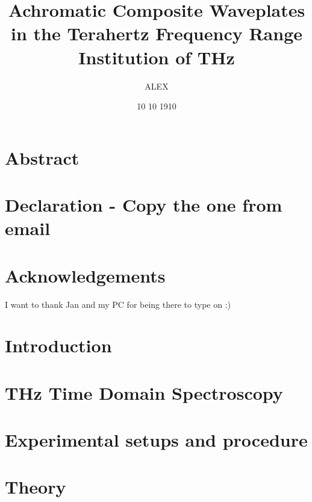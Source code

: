 \documentclass[12pt, a4paper]{report}
\title{
{Achromatic Composite Waveplates in the Terahertz Frequency Range}\\
{\large Institution of THz}\\
}
\author{ALEX}
\date{10 10 1910}
\begin{document}
\maketitle

\chapter*{Abstract}


\chapter*{Declaration - Copy the one from email} %

\chapter*{Acknowledgements}
I want to thank Jan and my PC for being there to type on :)

\tableofcontents %



\chapter{Introduction}

\chapter{THz Time Domain Spectroscopy}

\chapter{Experimental setups and procedure}

\chapter{Theory}
\end{document}
